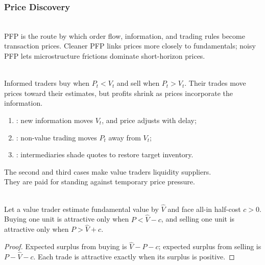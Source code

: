 \subsubsection{Price Discovery}

\begin{definition} \\
PFP is the route by which order flow, information, and trading rules become transaction prices. Cleaner PFP links prices more closely to fundamentals; noisy PFP lets microstructure frictions dominate short-horizon prices.
\end{definition}

\begin{mechanism} \\
Informed traders buy when $P_t<V_t$ and sell when $P_t>V_t$. Their trades move prices toward their estimates, but profits shrink as prices incorporate the information.
\end{mechanism}

\begin{taxonomy} 
\begin{enumerate}[label=\roman*.]
\setlength{\itemsep}{0pt}
\item {}: new information moves $V_t$, and price adjusts with delay;
\item {}: non-value trading moves $P_t$ away from $V_t$;
\item {}: intermediaries shade quotes to restore target inventory.
\end{enumerate}
The second and third cases make value traders liquidity suppliers.\\
They are paid for standing against temporary price pressure.
\end{taxonomy}

\begin{proposition} \\
Let a value trader estimate fundamental value by $\widehat{V}$ and face all-in half-cost $c>0$. Buying one unit is attractive only when $P<\widehat{V}-c$, and selling one unit is attractive only when $P>\widehat{V}+c$.
\begin{proof}
Expected surplus from buying is $\widehat{V}-P-c$; expected surplus from selling is $P-\widehat{V}-c$. Each trade is attractive exactly when its surplus is positive.
\end{proof}
\end{proposition}

